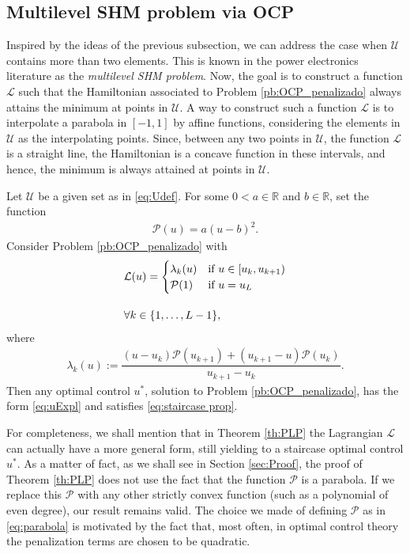 \documentclass[twocolumn]{autart}    %
\begin{document}
\subsection{Multilevel SHM problem via OCP}

Inspired by the ideas of the previous subsection, we can address the case when $\mathcal{U}$ contains more than two elements. This is known in the power electronics literature as the \textit{multilevel SHM problem}. Now, the goal is to construct a function $\mathcal{L}$ such that the Hamiltonian associated to Problem \ref{pb:OCP_penalizado} always attains the minimum at points in $\mathcal{U}$. 
A way to construct such a function $\mathcal{L}$ is to interpolate a parabola in $[-1,1]$ by affine functions, considering the elements in $\mathcal{U}$ as the interpolating points.  Since, between any two points in $\mathcal{U}$,  the function $\mathcal{L}$ is a straight line,  the Hamiltonian is a concave function in these intervals, and hence, the minimum is always attained at points in $\mathcal{U}$.

\vspace{1em}
\begin{theorem}\label{th:PLP}
Let $\mathcal{U}$ be a given set as in \eqref{eq:Udef}. For some $0<a\in\mathbb{R}$ and $b\in \mathbb{R}$, set the function
\begin{align}\label{eq:parabola}
	\mathcal{P}(u) = a (u-b)^2.
\end{align}
Consider Problem \ref{pb:OCP_penalizado} with 
\begin{align}\label{eq:PLP}
	&\mathcal{L}(u) = \begin{cases}
            \lambda_k(u) & \text{if }  u \in [u_k,u_{k+1}) \\ \mathcal{P}(1) & \text{if } u = u_{L} 
    \end{cases} 
	\\[10pt]
	&\notag \forall k \in \{1,\dots,L-1\}, 
\end{align}
where 
\begin{align}\label{eq:lambda k}
	\lambda_k(u):= \dfrac{ (u-u_k)\mathcal{P}(u_{k+1}) + (u_{k+1}- u) \mathcal{P}(u_k)}{u_{k+1} - u_k}.
\end{align}
Then any optimal control $u^\ast$, solution to Problem \ref{pb:OCP_penalizado}, has the form \eqref{eq:uExpl} and satisfies \eqref{eq:staircase prop}.
\end{theorem}

\medskip

\begin{remark}
For completeness, we shall mention that in Theorem \ref{th:PLP} the Lagrangian $\mathcal L$ can actually have a more general form, still yielding to a staircase optimal control $u^\ast$. As a matter of fact, as we shall see in Section \ref{sec:Proof}, the proof of Theorem \ref{th:PLP} does not use the fact that the function $\mathcal P$ is a parabola. If we replace this $\mathcal P$ with any other strictly convex function (such as a polynomial of even degree), our result remains valid. The choice we made of defining $\mathcal P$ as in \eqref{eq:parabola} is motivated by the fact that, most often, in optimal control theory the penalization terms are chosen to be quadratic.
\end{remark}
\end{document}
